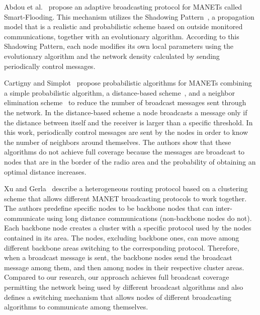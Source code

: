Abdou et al.~\cite{Abdou2012} propose an adaptive broadcasting protocol for MANETs called Smart-Flooding. 
This mechanism utilizes the Shadowing Pattern~\cite{Dhoutaut2006}, a propagation model that is a realistic and probabilistic scheme based on outside monitored communications, together with an evolutionary algorithm. 
According to this Shadowing Pattern, each node modifies its own local parameters using the evolutionary algorithm and the network density calculated by sending periodically control messages.

Cartigny and Simplot~\cite{ProbFlood} propose probabilistic algorithms for MANETs combining a simple probabilistic algorithm, a distance-based scheme~\cite{Ni1999},
and a neighbor elimination scheme~\cite{Peng2000,Stojmenovic20028} to reduce the number of broadcast messages sent through the network.
In the distance-based scheme a node broadcasts a message only if the distance between itself and the receiver is larger than a specific threshold.
In this work, periodically control messages are sent by the nodes in order to know the number of neighbors around themselves. 
The authors show that these algorithms do not achieve full coverage because the messages are broadcast to nodes that are in the border of the radio area and the probability of obtaining an optimal distance increases. 

Xu and Gerla~\cite{Kaixin2002} describe a heterogeneous routing protocol based on a clustering scheme that allows different MANET broadcasting protocols to work together.
The authors predefine specific nodes to be backbone nodes that can inter-communicate using long distance communications (non-backbone nodes do not). 
Each backbone node creates a cluster with a specific protocol used by the nodes contained in its area. 
The nodes, excluding backbone ones, can move among different backbone areas switching to the corresponding protocol. 
Therefore, when a broadcast message is sent, the backbone nodes send the broadcast message among them, and then among nodes in their respective cluster areas.
Compared to our research, our approach achieves full broadcast coverage permitting the network being used by different broadcast algorithms and also defines a switching mechanism that allows nodes of different broadcasting algorithms to communicate among themselves.

